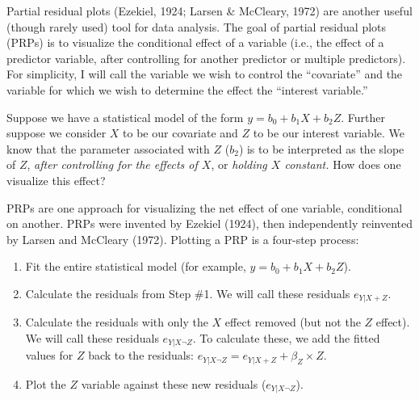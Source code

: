 \documentclass[
  man,floatsintext]{apa6}
\providecommand{\tightlist}{%
  \setlength{\itemsep}{0pt}\setlength{\parskip}{0pt}}
\begin{document}
Partial residual plots (Ezekiel, 1924; Larsen \& McCleary, 1972) are another useful (though rarely used) tool for data analysis. The goal of partial residual plots (PRPs) is to visualize the conditional effect of a variable (i.e., the effect of a predictor variable, after controlling for another predictor or multiple predictors). For simplicity, I will call the variable we wish to control the ``covariate'' and the variable for which we wish to determine the effect the ``interest variable.''

Suppose we have a statistical model of the form \(y = b_0 + b_1 X + b_2 Z\). Further suppose we consider \(X\) to be our covariate and \(Z\) to be our interest variable. We know that the parameter associated with \(Z\) (\(b_2\)) is to be interpreted as the slope of \(Z\), \emph{after controlling for the effects of \(X\)}, or \emph{holding \(X\) constant.} How does one visualize this effect?

PRPs are one approach for visualizing the net effect of one variable, conditional on another. PRPs were invented by Ezekiel (1924), then independently reinvented by Larsen and McCleary (1972). Plotting a PRP is a four-step process:

\begin{enumerate}
\def\labelenumi{\arabic{enumi}.}
\tightlist
\item
  Fit the entire statistical model (for example, \(y = b_0 + b_1 X + b_2 Z\)).
\item
  Calculate the residuals from Step \#1. We will call these residuals \(e_{Y|X + Z}\).
\item
  Calculate the residuals with only the \(X\) effect removed (but not the \(Z\) effect). We will call these residuals \(e_{Y|X \neg Z}\). To calculate these, we add the fitted values for \(Z\) back to the residuals: \(e_{Y|X \neg Z} = e_{Y|X + Z} + \beta_Z \times Z\).
\item
  Plot the \(Z\) variable against these new residuals (\(e_{Y|X \neg Z}\)).
\end{enumerate}
\end{document}
